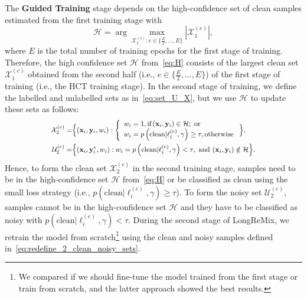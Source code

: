 \documentclass[review]{elsarticle}
\begin{document}
The \textbf{Guided Training} stage depends on the high-confidence set of clean samples estimated from the first training stage with
\begin{equation}
    \mathcal{H} = \arg \max_{\mathcal{X}_{1}^{(e)}:e \in \{ \frac{E}{2},...,E\} }  |\mathcal{X}_{1}^{(e)}|,
    \label{eq:H}
\end{equation}
where $E$ is the total number of training epochs for the first stage of training. 
Therefore, the high confidence set $\mathcal{H}$ from~\eqref{eq:H} consists of the largest clean set $\mathcal{X}_1^{(e)}$ obtained from the second half (i.e., $e \in \{ \frac{E}{2},...,E\}$) of the first stage of training (i.e., the HCT training stage).
In the second stage of training, we define the labelled and unlabelled sets as in~\eqref{eq:set_U_X}, but we use $\mathcal{H}$ to update these sets as follows:
\begin{equation}
\scalebox{0.85}{
$
\begin{split}
\mathcal{X}_2^{(e)} =&
\Big \{  (\mathbf{x}_i,\mathbf{y}_i,w_i) : 
\left\{\begin{array}{l}
w_i=1 ,\textrm{if} \left (\mathbf{x}_i,\mathbf{y}_i \right) \in \mathcal{H}; \text{ or} \\ 
w_i=p \left( \textrm{clean} |   \ell_i^{(e)}  , \gamma \right)\ge \tau ,\textrm{otherwise} 
\end{array}\right.\Big \},\\
 \mathcal{U}_2^{(e)} = & \Big \{  (\mathbf{x}_i,\mathbf{y}_i^{*},w_i) : 
w_i=p  \left( \text{clean} | \ell_i^{(e)} , \gamma \right ) < \tau,   \text{ and }  (\mathbf{x}_i,\mathbf{y}_i) \notin \mathcal{H}   \Big \}.
\end{split}
$
}
\label{eq:redefine_2_clean_noisy_sets}
\end{equation}
Hence, to form the clean set $\mathcal{X}_2^{(e)}$ in the second training stage, samples need to be in the high-confidence set $\mathcal{H}$ from~\eqref{eq:H} or be classified as clean using the small loss strategy (i.e., $p( \textrm{clean} |   \ell_i^{(e)}  , \gamma )\ge \tau$).  To form the noisy set $\mathcal{U}_2^{(e)}$, samples cannot be in the high-confidence set $\mathcal{H}$ and they have to be classified as noisy with $p ( \textrm{clean} |   \ell_i^{(e)}  , \gamma ) < \tau$.
During the second stage of LongReMix, we retrain the model from scratch\footnote{We compared 
if we should fine-tune the model trained from the first stage or train from scratch, and the latter approach showed the best results.} using the
clean and noisy samples defined in~\eqref{eq:redefine_2_clean_noisy_sets}.
\end{document}
